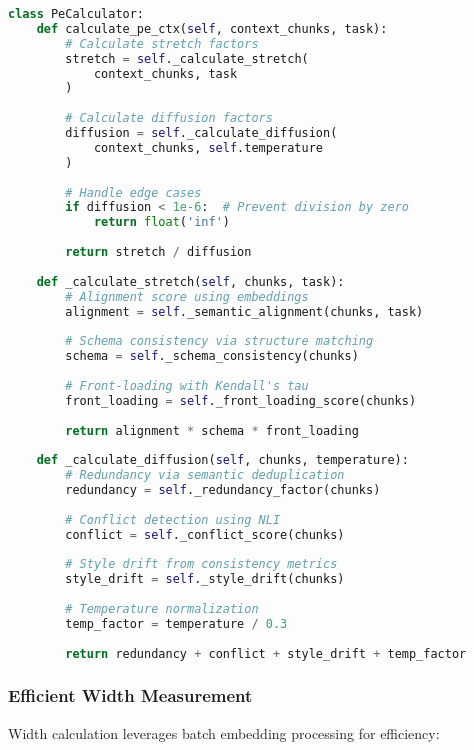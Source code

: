 \documentclass[conference]{IEEEtran}
\begin{document}
\begin{lstlisting}[language=Python, basicstyle=\small]
class PeCalculator:
    def calculate_pe_ctx(self, context_chunks, task):
        # Calculate stretch factors
        stretch = self._calculate_stretch(
            context_chunks, task
        )
        
        # Calculate diffusion factors
        diffusion = self._calculate_diffusion(
            context_chunks, self.temperature
        )
        
        # Handle edge cases
        if diffusion < 1e-6:  # Prevent division by zero
            return float('inf')
        
        return stretch / diffusion
    
    def _calculate_stretch(self, chunks, task):
        # Alignment score using embeddings
        alignment = self._semantic_alignment(chunks, task)
        
        # Schema consistency via structure matching
        schema = self._schema_consistency(chunks)
        
        # Front-loading with Kendall's tau
        front_loading = self._front_loading_score(chunks)
        
        return alignment * schema * front_loading
    
    def _calculate_diffusion(self, chunks, temperature):
        # Redundancy via semantic deduplication
        redundancy = self._redundancy_factor(chunks)
        
        # Conflict detection using NLI
        conflict = self._conflict_score(chunks)
        
        # Style drift from consistency metrics
        style_drift = self._style_drift(chunks)
        
        # Temperature normalization
        temp_factor = temperature / 0.3
        
        return redundancy + conflict + style_drift + temp_factor
\end{lstlisting}

\subsubsection{Efficient Width Measurement}

Width calculation leverages batch embedding processing for efficiency:
\end{document}
